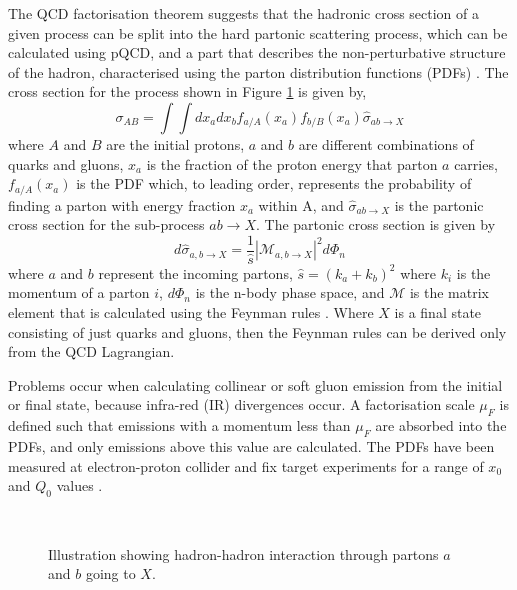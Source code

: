 The QCD factorisation theorem suggests that the hadronic cross section of a given process can be split into the hard partonic scattering process, which can be calculated using pQCD, and a part that describes the non-perturbative structure of the hadron, characterised using the parton distribution functions (PDFs) \cite{ref:HardInt}.
The cross section for the process shown in Figure \ref{Theory:HadronHadron} is given by,
\begin{equation}
\sigma_{AB}=\int\int dx_a dx_b f_{a/A}(x_a) f_{b/B}(x_a) \hat{\sigma}_{ab\rightarrow X}
\label{Theory:XSec}
\end{equation}
where $A$ and $B$ are the initial protons, $a$ and $b$ are different combinations of quarks and gluons, $x_a$ is the fraction of the proton energy that parton $a$ carries, $ f_{a/A}(x_a)$ is the PDF which, to leading order, represents the probability of finding a parton with energy fraction  $x_a$ within A, and $\hat{\sigma}_{ab\rightarrow X}$ is the partonic cross section for the sub-process $ab\rightarrow X$.
The partonic cross section is given by
\begin{equation}
d \hat{\sigma}_{a,b\rightarrow X}= \frac{1}{\hat{s}}|\mathcal{M}_{a,b\rightarrow X}|^{2} d\Phi_n
\label{Theory:PartonCrossSection}
\end{equation}
where $a$ and $b$ represent the incoming partons, $\hat{s}= (k_a + k_b)^2$ where $k_i$ is the momentum of a parton $i$, $d\Phi_n$ is the n-body phase space, and $\mathcal{M}$ is the matrix element that is calculated using the Feynman rules \cite{ref:Webber}.
Where $X$ is a final state consisting of just quarks and gluons, then the Feynman rules can be derived only from the QCD Lagrangian. 

Problems occur when calculating collinear or soft gluon emission from the initial or final state, because infra-red (IR) divergences occur.  
A factorisation scale $\mu_F$ is defined such that emissions with a momentum less than $\mu_F$ are absorbed into the PDFs, and only emissions above this value are calculated. 
The PDFs have been measured at electron-proton collider and fix target experiments for a range of $x_0$ and $Q_0$ values \cite{ref:PDF1,ref:PDF2,ref:MRST}. 

\begin{figure}
\centering
\mbox{
                              }
\caption[Illustration of a hadron-hadron interaction]{
Illustration showing hadron-hadron interaction through partons $a$ and $b$ going to $X$. 
\label{Theory:HadronHadron}}
\end{figure}


